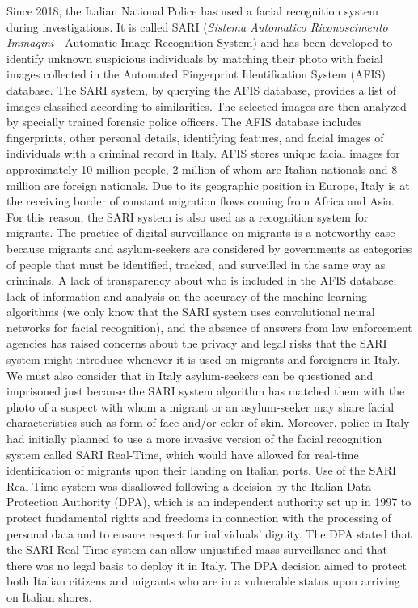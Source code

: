 Since 2018, the Italian National Police has used a facial recognition system during investigations. It is called SARI (\textit{Sistema Automatico Riconoscimento Immagini}---Automatic Image-Recognition System) and has been developed to identify unknown suspicious individuals by matching their photo with facial images collected in the Automated Fingerprint Identification System (AFIS) database. The SARI system, by querying the AFIS database, provides a list of images classified according to similarities. The selected images are then analyzed by specially trained forensic police officers. The AFIS database includes fingerprints, other personal details, identifying features, and facial images of individuals with a criminal record in Italy. AFIS stores unique facial images for approximately 10 million people, 2 million of whom are Italian nationals and 8 million are foreign nationals. Due to its geographic position in Europe, Italy is at the receiving border of constant migration flows coming from Africa and Asia. For this reason, the SARI system is also used as a recognition system for migrants. The practice of digital surveillance on migrants is a noteworthy case because migrants and asylum-seekers are considered by governments as categories of people that must be identified, tracked, and surveilled in the same way as criminals. A lack of transparency about who is included in the AFIS database, lack of information and analysis on the accuracy of the machine learning algorithms (we only know that the SARI system uses convolutional neural networks for facial recognition), and the absence of answers from law enforcement agencies has raised concerns about the privacy and legal risks that the SARI system might introduce whenever it is used on migrants and foreigners in Italy. We must also consider that in Italy asylum-seekers can be questioned and imprisoned just because the SARI system algorithm has matched them with the photo of a suspect with whom a migrant or an asylum-seeker may share facial characteristics such as form of face and/or color of skin. Moreover, police in Italy had initially planned to use a more invasive version of the facial recognition system called SARI Real-Time, which would have allowed for real-time identification of migrants upon their landing on Italian ports. Use of the SARI Real-Time system was disallowed following a decision by the Italian Data Protection Authority (DPA), which is an independent authority set up in 1997 to protect fundamental rights and freedoms in connection with the processing of personal data and to ensure respect for individuals' dignity. The DPA stated that the SARI Real-Time system can allow unjustified mass surveillance and that there was no legal basis to deploy it in Italy. The DPA decision aimed to protect both Italian citizens and migrants who are in a vulnerable status upon arriving on Italian shores.


